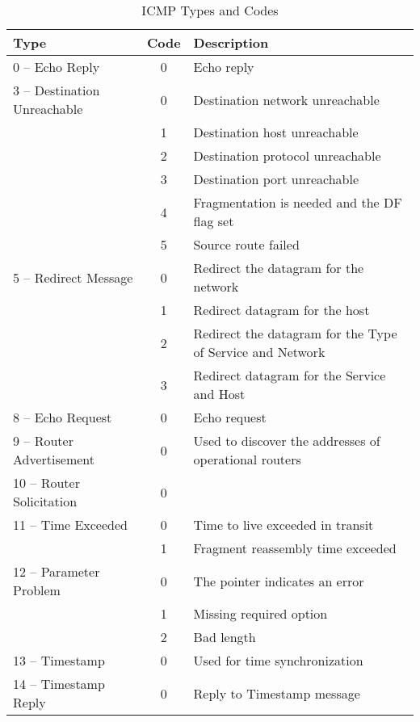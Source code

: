 \begin{table}[h]
	\centering
	\begin{tabular}{|l|c|l|}
		\hline
		\textbf{Type} & \textbf{Code} & \textbf{Description} \\
		\hline
		0 – Echo Reply & 0 & Echo reply \\
		\hline
		3 – Destination Unreachable & 0 & Destination network unreachable \\
		& 1 & Destination host unreachable \\
		& 2 & Destination protocol unreachable \\
		& 3 & Destination port unreachable \\
		& 4 & Fragmentation is needed and the DF flag set \\
		& 5 & Source route failed \\
		\hline
		5 – Redirect Message & 0 & Redirect the datagram for the network \\
		& 1 & Redirect datagram for the host \\
		& 2 & Redirect the datagram for the Type of Service and Network \\
		& 3 & Redirect datagram for the Service and Host \\
		\hline
		8 – Echo Request & 0 & Echo request \\
		\hline
		9 – Router Advertisement & 0 & {Used to discover the addresses of operational routers} \\
		10 – Router Solicitation & 0 & \\
		\hline
		{11 – Time Exceeded} & 0 & Time to live exceeded in transit \\
		& 1 & Fragment reassembly time exceeded \\
		\hline
		{12 – Parameter Problem} & 0 & The pointer indicates an error \\
		& 1 & Missing required option \\
		& 2 & Bad length \\
		\hline
		13 – Timestamp & 0 & Used for time synchronization \\
		\hline
		14 – Timestamp Reply & 0 & Reply to Timestamp message \\
		\hline
	\end{tabular}
	\caption{ICMP Types and Codes}
	\label{tab:icmp}
\end{table}

\newpage












